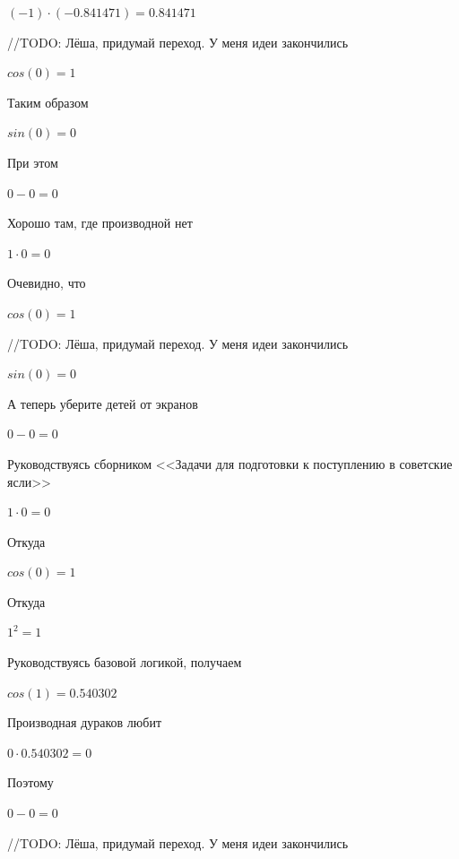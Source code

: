 \documentclass[12pt,a4paper,fleqn]{article}
\begin{document}
\begin{center}$(-1) \cdot (-0.841471) = 0.841471$\end{center}
//TODO: Лёша, придумай переход. У меня идеи закончились

\begin{center}$cos(0) = 1$\end{center}
Таким образом

\begin{center}$sin(0) = 0$\end{center}
При этом

\begin{center}$0-0 = 0$\end{center}
Хорошо там, где производной нет\cite{link2}

\begin{center}$1 \cdot 0 = 0$\end{center}
Очевидно, что

\begin{center}$cos(0) = 1$\end{center}
//TODO: Лёша, придумай переход. У меня идеи закончились

\begin{center}$sin(0) = 0$\end{center}
А теперь уберите детей от экранов

\begin{center}$0-0 = 0$\end{center}
Руководствуясь сборником <<Задачи для подготовки к поступлению в советские ясли>>\cite{link1}

\begin{center}$1 \cdot 0 = 0$\end{center}
Откуда

\begin{center}$cos(0) = 1$\end{center}
Откуда

\begin{center}$1^{2} = 1$\end{center}
Руководствуясь базовой логикой, получаем

\begin{center}$cos(1) = 0.540302$\end{center}
Производная дураков любит\cite{link2}

\begin{center}$0 \cdot 0.540302 = 0$\end{center}
Поэтому

\begin{center}$0-0 = 0$\end{center}
//TODO: Лёша, придумай переход. У меня идеи закончились
\end{document}
